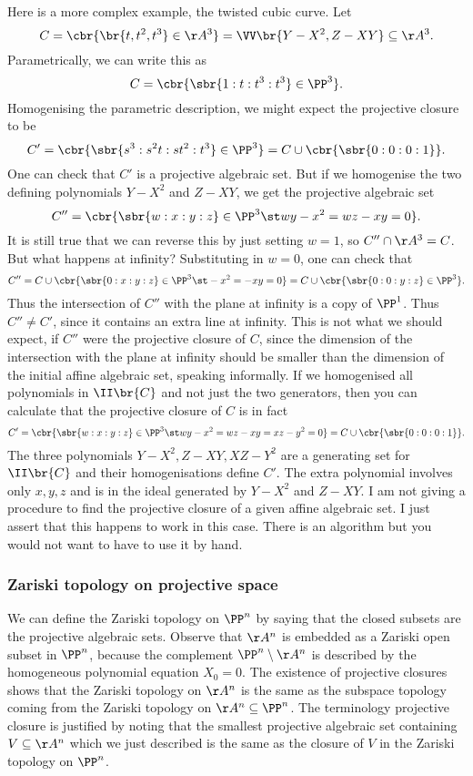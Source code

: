 \begin{example*}
Here is a more complex example, the twisted cubic curve. Let
$$ C = \cbr{\br{t, t^2, t^3} \in \AA^3} = \VV\br{Y - X^2, Z - XY} \subseteq \AA^3. $$
Parametrically, we can write this as
$$ C = \cbr{\sbr{1 : t : t^3 : t^3} \in \PP^3}. $$
Homogenising the parametric description, we might expect the projective closure to be
$$ C' = \cbr{\sbr{s^3 : s^2t : st^2 : t^3} \in \PP^3} = C \cup \cbr{\sbr{0 : 0 : 0 : 1}}. $$
One can check that $ C' $ is a projective algebraic set. But if we homogenise the two defining polynomials $ Y - X^2 $ and $ Z - XY $, we get the projective algebraic set
$$ C'' = \cbr{\sbr{w : x : y : z} \in \PP^3 \st wy - x^2 = wz - xy = 0}. $$
It is still true that we can reverse this by just setting $ w = 1 $, so $ C'' \cap \AA^3 = C $. But what happens at infinity? Substituting in $ w = 0 $, one can check that
$$ C'' = C \cup \cbr{\sbr{0 : x : y : z} \in \PP^3 \st -x^2 = -xy = 0} = C \cup \cbr{\sbr{0 : 0 : y : z} \in \PP^3}. $$
Thus the intersection of $ C'' $ with the plane at infinity is a copy of $ \PP^1 $. Thus $ C'' \ne C' $, since it contains an extra line at infinity. This is not what we should expect, if $ C'' $ were the projective closure of $ C $, since the dimension of the intersection with the plane at infinity should be smaller than the dimension of the initial affine algebraic set, speaking informally. If we homogenised all polynomials in $ \II\br{C} $ and not just the two generators, then you can calculate that the projective closure of $ C $ is in fact
$$ C' = \cbr{\sbr{w : x : y : z} \in \PP^3 \st wy - x^2 = wz - xy = xz - y^2 = 0} = C \cup \cbr{\sbr{0 : 0 : 0 : 1}}. $$
The three polynomials $ Y - X^2, Z - XY, XZ - Y^2 $ are a generating set for $ \II\br{C} $ and their homogenisations define $ C' $. The extra polynomial involves only $ x, y, z $ and is in the ideal generated by $ Y - X^2 $ and $ Z - XY $. I am not giving a procedure to find the projective closure of a given affine algebraic set. I just assert that this happens to work in this case. There is an algorithm but you would not want to have to use it by hand.
\end{example*}

\pagebreak

\subsubsection{Zariski topology on projective space}

We can define the Zariski topology on $ \PP^n $ by saying that the closed subsets are the projective algebraic sets. Observe that $ \AA^n $ is embedded as a Zariski open subset in $ \PP^n $, because the complement $ \PP^n \setminus \AA^n $ is described by the homogeneous polynomial equation $ X_0 = 0 $. The existence of projective closures shows that the Zariski topology on $ \AA^n $ is the same as the subspace topology coming from the Zariski topology on $ \AA^n \subseteq \PP^n $. The terminology projective closure is justified by noting that the smallest projective algebraic set containing $ V \subseteq \AA^n $ which we just described is the same as the closure of $ V $ in the Zariski topology on $ \PP^n $.

